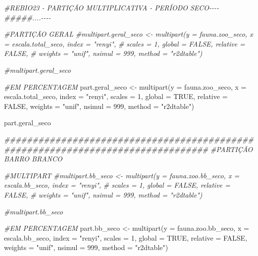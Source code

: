 \documentclass[
  letterpaper,
  DIV=11,
  numbers=noendperiod]{scrartcl}
\newenvironment{Shaded}{}{}
\newcommand{\AttributeTok}[1]{\textcolor[rgb]{0.49,0.56,0.16}{#1}}
\newcommand{\CommentTok}[1]{\textcolor[rgb]{0.38,0.63,0.69}{\textit{#1}}}
\newcommand{\ConstantTok}[1]{\textcolor[rgb]{0.53,0.00,0.00}{#1}}
\newcommand{\DecValTok}[1]{\textcolor[rgb]{0.25,0.63,0.44}{#1}}
\newcommand{\DocumentationTok}[1]{\textcolor[rgb]{0.73,0.13,0.13}{\textit{#1}}}
\newcommand{\FunctionTok}[1]{\textcolor[rgb]{0.02,0.16,0.49}{#1}}
\newcommand{\NormalTok}[1]{#1}
\newcommand{\OtherTok}[1]{\textcolor[rgb]{0.00,0.44,0.13}{#1}}
\newcommand{\StringTok}[1]{\textcolor[rgb]{0.25,0.44,0.63}{#1}}
\begin{document}
\begin{Shaded}
\begin{Highlighting}[numbers=left,,]
\CommentTok{\#REBIO23 {-} PARTIÇÃO MULTIPLICATIVA {-} PERÍODO SECO{-}{-}{-}{-}}
\DocumentationTok{\#\#\#\#\#....{-}{-}{-}{-}}

\CommentTok{\#PARTIÇÃO GERAL}
\CommentTok{\#multipart.geral\_seco \textless{}{-} multipart(y = fauna.zoo\_seco, x = escala.total\_seco, index = "renyi",}
\CommentTok{\#                             scales = 1, global = FALSE, relative = FALSE,}
\CommentTok{\#                             weights = "unif", nsimul = 999, method = "r2dtable")}

\CommentTok{\#multipart.geral\_seco}


\CommentTok{\#EM PERCENTAGEM}
\NormalTok{part.geral\_seco }\OtherTok{\textless{}{-}} \FunctionTok{multipart}\NormalTok{(}\AttributeTok{y =}\NormalTok{ fauna.zoo\_seco, }\AttributeTok{x =}\NormalTok{ escala.total\_seco, }\AttributeTok{index =} \StringTok{"renyi"}\NormalTok{,}
                        \AttributeTok{scales =} \DecValTok{1}\NormalTok{, }\AttributeTok{global =} \ConstantTok{TRUE}\NormalTok{, }\AttributeTok{relative =} \ConstantTok{FALSE}\NormalTok{,}
                        \AttributeTok{weights =} \StringTok{"unif"}\NormalTok{, }\AttributeTok{nsimul =} \DecValTok{999}\NormalTok{, }\AttributeTok{method =} \StringTok{"r2dtable"}\NormalTok{)}

\NormalTok{part.geral\_seco}

\DocumentationTok{\#\#\#\#\#\#\#\#\#\#\#\#\#\#\#\#\#\#\#\#\#\#\#\#\#\#\#\#\#\#\#\#\#\#\#\#\#\#\#\#\#\#\#\#\#\#\#\#\#\#\#\#\#\#\#\#\#\#\#\#\#\#\#\#\#\#\#\#\#\#\#\#\#\#\#\#\#\#\#\#}
\CommentTok{\#PARTIÇÃO BARRO BRANCO}

\CommentTok{\#MULTIPART}
\CommentTok{\#multipart.bb\_seco \textless{}{-} multipart(y = fauna.zoo.bb\_seco, x = escala.bb\_seco, index = "renyi",}
\CommentTok{\#                          scales = 1, global = FALSE, relative = FALSE,}
\CommentTok{\#                          weights = "unif", nsimul = 999, method = "r2dtable")}

\CommentTok{\#multipart.bb\_seco}


\CommentTok{\#EM PERCENTAGEM}
\NormalTok{part.bb\_seco }\OtherTok{\textless{}{-}} \FunctionTok{multipart}\NormalTok{(}\AttributeTok{y =}\NormalTok{ fauna.zoo.bb\_seco, }\AttributeTok{x =}\NormalTok{ escala.bb\_seco, }\AttributeTok{index =} \StringTok{"renyi"}\NormalTok{,}
                     \AttributeTok{scales =} \DecValTok{1}\NormalTok{, }\AttributeTok{global =} \ConstantTok{TRUE}\NormalTok{, }\AttributeTok{relative =} \ConstantTok{FALSE}\NormalTok{,}
                     \AttributeTok{weights =} \StringTok{"unif"}\NormalTok{, }\AttributeTok{nsimul =} \DecValTok{999}\NormalTok{, }\AttributeTok{method =} \StringTok{"r2dtable"}\NormalTok{)}


\end{Highlighting}
\end{Shaded}
\end{document}
